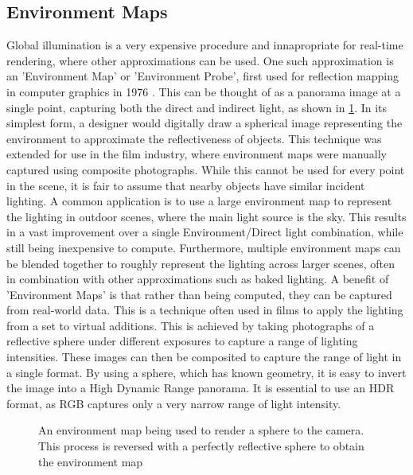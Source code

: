 \documentclass[ %
                    author={Gavin Parker},
                supervisor={Dr. Neill Campbell},
                    degree={MEng},
                     title={Deep Siamese Networks for Illumination Estimation from Stereo Images},
                  subtitle={},
                      type={research},
                      year={2018} ]{dissertation}
\begin{document}
\subsection{Environment Maps}
Global illumination is a very expensive procedure and innapropriate for real-time rendering, where other approximations can be used. One such approximation is an 'Environment Map' or 'Environment Probe', first used for reflection mapping in computer graphics in 1976 \cite{Blinn:1976:TRC:360349.360353}. This can be thought of as a panorama image at a single point, capturing both the direct and indirect light, as shown in \ref{environment map}. In its simplest form, a designer would digitally draw a spherical image representing the environment to approximate the reflectiveness of objects. This technique was extended for use in the film industry, where environment maps were manually captured using composite photographs\cite{Debevec:1998:RSO:280814.280864}. While this cannot be used for every point in the scene, it is fair to assume that nearby objects have similar incident lighting. A common application is to use a large environment map to represent the lighting in outdoor scenes, where the main light source is the sky. This results in a vast improvement over a single Environment/Direct light combination, while still being inexpensive to compute. Furthermore, multiple environment maps can be blended together to roughly represent the lighting across larger scenes, often in combination with other approximations such as baked lighting.
\newline
A benefit of 'Environment Maps' is that rather than being computed, they can be captured from real-world data. This is a technique often used in films to apply the lighting from a set to virtual additions. This is achieved by taking photographs of a reflective sphere under different exposures to capture a range of lighting intensities. These images can then be composited to capture the range of light in a single format. By using a sphere, which has known geometry, it is easy to invert the image into a High Dynamic Range panorama. It is essential to use an HDR format, as RGB captures only a very narrow range of light intensity.
\begin{center}
\begin{figure}
\centering
{}
\label{environment map}
\caption{An environment map being used to render a sphere to the camera. This process is reversed with a perfectly reflective sphere to obtain the environment map}
\end{figure}
\end{center}
\end{document}
